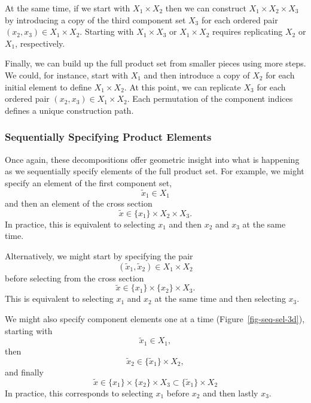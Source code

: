 \documentclass[
  letterpaper,
  DIV=11,
  numbers=noendperiod]{scrartcl}
\begin{document}
At the same time, if we start with \(X_{1} \times X_{2}\) then we can
construct \(X_{1} \times X_{2} \times X_{3}\) by introducing a copy of
the third component set \(X_{3}\) for each ordered pair
\((x_{2}, x_{3}) \in X_{1} \times X_{2}\). Starting with
\(X_{1} \times X_{3}\) or \(X_{1} \times X_{2}\) requires replicating
\(X_{2}\) or \(X_{1}\), respectively.

Finally, we can build up the full product set from smaller pieces using
more steps. We could, for instance, start with \(X_{1}\) and then
introduce a copy of \(X_{2}\) for each initial element to define
\(X_{1} \times X_{2}\). At this point, we can replicate \(X_{3}\) for
each ordered pair \((x_{2}, x_{3}) \in X_{1} \times X_{2}\). Each
permutation of the component indices defines a unique construction path.

\subsubsection{Sequentially Specifying Product
Elements}\label{sequentially-specifying-product-elements}

Once again, these decompositions offer geometric insight into what is
happening as we sequentially specify elements of the full product set.
For example, we might specify an element of the first component set, \[
\tilde{x}_{1} \in X_{1}
\] and then an element of the cross section \[
\tilde{x} \in \{ x_{1} \} \times X_{2} \times X_{3}.
\] In practice, this is equivalent to selecting \(x_{1}\) and then
\(x_{2}\) and \(x_{3}\) at the same time.

Alternatively, we might start by specifying the pair \[
(\tilde{x}_{1}, \tilde{x}_{2}) \in X_{1} \times X_{2}
\] before selecting from the cross section \[
\tilde{x} \in \{ x_{1} \} \times \{ x_{2} \} \times X_{3}.
\] This is equivalent to selecting \(x_{1}\) and \(x_{2}\) at the same
time and then selecting \(x_{3}\).

We might also specify component elements one at a time
(Figure~\ref{fig-seq-sel-3d}), starting with \[
\tilde{x}_{1} \in X_{1},
\] then \[
\tilde{x}_{2} \in \{ \tilde{x}_{1} \} \times X_{2},
\] and finally \[
\tilde{x}
\in
\{ x_{1} \} \times \{ x_{2} \} \times X_{3}
\subset
\{ \tilde{x}_{1} \} \times X_{2}
\] In practice, this corresponds to selecting \(x_{1}\) before \(x_{2}\)
and then lastly \(x_{3}\).
\end{document}
